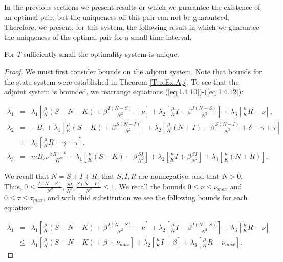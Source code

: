 In the previous sections we present results or which we guarantee the existence of an optimal pair, but the uniqueness off this pair can not be guaranteed. Therefore, we present, for this system, the following result in which we guarantee the uniqueness of the optimal pair for a small time interval.

\begin{theorem}
	For $T$ sufficiently small the optimality system is unique.
\end{theorem}
\begin{proof}
We must first consider bounds on the adjoint system. Note that bounds for the state system were established in Theorem	\ref{Teo.Ex.Ap}. To see that the adjoint system is bounded, we rearrange equations (\ref{eq.1.4.10})-(\ref{eq.1.4.12}):

\begin{eqnarray*}
\dot{\lambda_1}&=& \lambda_1\left[\frac{\mu}{K}(S+N-K)+\beta\frac{I(N-S)}{N^2}+\nu\right]+\lambda_2\left[\frac{\mu}{K}I-\beta\frac{I(N-S)}{N^2}\right]+\lambda_3\left[\frac{\mu}{K}R-\nu\right],\\
\dot{\lambda_2}&=& -B_1+\lambda_1\left[\frac{\mu}{K}(S-K)+\beta\frac{S(N-I)}{N^2}\right]+\lambda_2\left[\frac{\mu}{K}(N+I)-\beta\frac{S(N-I)}{N^2}+\delta+\gamma+\tau \right]\\
&+&\lambda_3\left[\frac{\mu}{K}R-\gamma-\tau\right],\\
\dot{\lambda_3}&=& mB_2\nu^2\frac{R^{m-1}}{K^m}+\lambda_1\left[\frac{\mu}{K}(S-K)-\beta\frac{SI}{N^2}\right]+\lambda_2\left[\frac{\mu}{K}I+\beta\frac{SI}{N^2}\right]+\lambda_3\left[\frac{\mu}{K}(N+R)\right].
\end{eqnarray*}

We recall that $N=S+I+R$, that $S,I,R$ are nonnegative, and that $N>0$. Thus, $0\leq \frac{I(N-S)}{N^2},\frac{SI}{N^2},\frac{S(N-I)}{N^2}\leq 1$. We recall the bounds $0\leq \nu\leq \nu_{max}$ and $0\leq \tau \leq \tau_{max}$, and with thid substitution we see the following bounds for each equation:

\begin{eqnarray*}
\dot{\lambda_1}&=& \lambda_1\left[\frac{\mu}{K}(S+N-K)+\beta\frac{I(N-S)}{N^2}+\nu\right]+\lambda_2\left[\frac{\mu}{K}I-\beta\frac{I(N-S)}{N^2}\right]+\lambda_3\left[\frac{\mu}{K}R-\nu\right]\\
&\leq& \lambda_1\left[\frac{\mu}{K}(S+N-K)+\beta+\nu_{max}\right]+\lambda_2\left[\frac{\mu}{K}I-\beta\right]+\lambda_3\left[\frac{\mu}{K}R-\nu_{max}\right].
\end{eqnarray*}


\end{proof}
